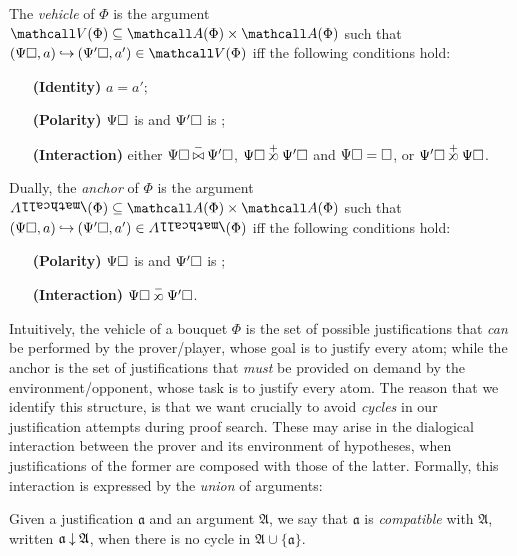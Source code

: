 \begin{scope}
\begin{definition}
  The \emph{vehicle} of $\Phi$ is the argument $\vehicle{\Phi} \subseteq
  \atomoccs{\Phi} \times \atomoccs{\Phi}$ such that $(\Psi\hole, a) \justi
  (\Psi'\hole, a') \in \vehicle{\Phi}$ iff the following conditions hold:
  \begin{itemize}
    \item[\textbf{(Identity)}] $a = a'$;
    \item[\textbf{(Polarity)}] $\Psi\square$ is  and $\Psi'\square$ is
    ;
    \item[\textbf{(Interaction)}] either $\Psi\hole \cinterneg \Psi'\hole$,
    $\Psi\hole \sinterpos \Psi'\hole$ and $\Psi\square = \square$, or $\Psi'\hole
    \sinterpos \Psi\hole$.
  \end{itemize}

  Dually, the \emph{anchor} of $\Phi$ is the argument $\anchor{\Phi} \subseteq
  \atomoccs{\Phi} \times \atomoccs{\Phi}$ such that $(\Psi\hole, a) \justi
  (\Psi'\hole, a') \in \anchor{\Phi}$ iff the following conditions hold:
  \begin{itemize}
    \item[\textbf{(Polarity)}] $\Psi\square$ is  and $\Psi'\square$ is
    ;
    \item[\textbf{(Interaction)}] $\Psi\hole \sinterneg \Psi'\hole$.
  \end{itemize}
\end{definition}

Intuitively, the vehicle of a bouquet $\Phi$ is the set of possible
justifications that \emph{can} be performed by the prover/player, whose goal is
to justify every  atom; while the anchor is the set of justifications
that \emph{must} be provided on demand by the environment/opponent, whose task
is to justify every  atom. The reason that we identify this structure,
is that we want crucially to avoid \emph{cycles} in our justification attempts
during proof search. These may arise in the dialogical interaction between the
prover and its environment of hypotheses, when justifications of the former are
composed with those of the latter. Formally, this interaction is expressed by
the \emph{union} of arguments:

\begin{definition}[Compatibility]
  Given a justification $\mathfrak{a}$ and an argument $\mathfrak{A}$, we say
  that $\mathfrak{a}$ is \emph{compatible} with $\mathfrak{A}$, written
  $\mathfrak{a} \mathbin{\downarrow} \mathfrak{A}$, when there is no cycle in $\mathfrak{A}
  \cup \{\mathfrak{a}\}$.
\end{definition}


\end{scope}
